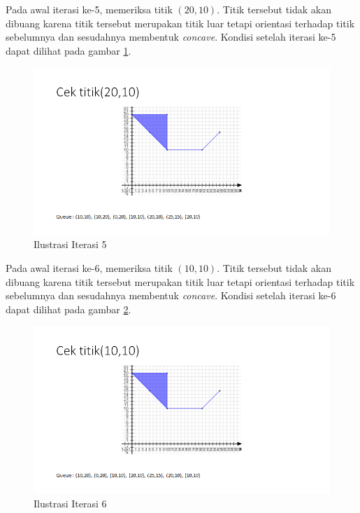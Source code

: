\par Pada awal iterasi ke-5, memeriksa titik $(20,10)$. Titik tersebut tidak akan dibuang karena titik tersebut merupakan titik luar tetapi orientasi terhadap titik sebelumnya dan sesudahnya membentuk \textit{concave}. Kondisi setelah iterasi ke-5 dapat dilihat pada gambar \ref{fig:iterasi-5}.
\begin{figure}[!h]
	\Centering
	\includegraphics [width=\columnwidth]{bab5/img/iterasi-5}
	\caption {Ilustrasi Iterasi 5}
	\label {fig:iterasi-5}
\end{figure}

\par Pada awal iterasi ke-6, memeriksa titik $(10,10)$. Titik tersebut tidak akan dibuang karena titik tersebut merupakan titik luar tetapi orientasi terhadap titik sebelumnya dan sesudahnya membentuk \textit{concave}. Kondisi setelah iterasi ke-6 dapat dilihat pada gambar \ref{fig:iterasi-6}.
\begin{figure}[!h]
	\Centering
	\includegraphics [width=\columnwidth]{bab5/img/iterasi-6}
	\caption {Ilustrasi Iterasi 6}
	\label {fig:iterasi-6}
\end{figure}

